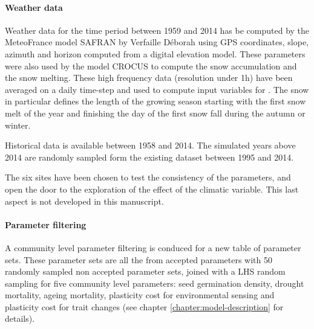 
\paragraph{Weather data}
Weather data for the time period between 1959 and 2014 has be computed by the MeteoFrance model SAFRAN by Verfaille Déborah using GPS coordinates, slope, azimuth and horizon computed from a digital elevation model. These parameters were also used by the model CROCUS to compute the snow accumulation and the snow melting. These high frequency data (resolution under 1h) have been averaged on a daily time-step and used to compute input variables for \model. The snow in particular defines the length of the growing season starting with the first snow melt of the year and finishing the day of the first snow fall during the autumn or winter.

Historical data is available between 1958 and 2014. The simulated years above 2014 are randomly sampled form the existing dataset between 1995 and 2014.

The six sites have been chosen to test the consistency of the parameters, and open the door to the exploration of the effect of the climatic variable. This last aspect is not developed in this manuscript.

\paragraph{Parameter filtering}
A community level parameter filtering is conduced for a new table of parameter sets. These parameter sets are all the from accepted parameters with 50 randomly sampled non accepted parameter sets, joined with a LHS random sampling for five community level parameters: seed germination density, drought mortality, ageing mortality, plasticity cost for environmental sensing and plasticity cost for trait changes (see chapter \ref{chapter:model-description} for details).

